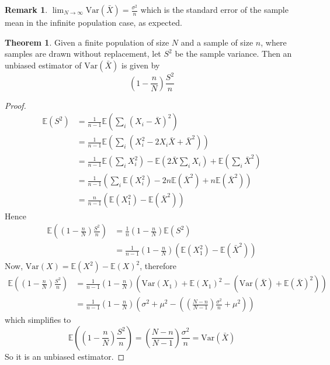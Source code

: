 \documentclass[12pt,a4paper]{article}
\theoremstyle{definition}
\newtheorem{theorem}[definition]{Theorem}
\newtheorem*{remark}{Remark}
\begin{document}
\begin{remark}
	$\lim_{N \rightarrow \infty} \text{Var}(\bar{X}) = \frac{\sigma^2}{n}$ which is the standard error of the sample mean in the infinite population case, as expected.
\end{remark}

\begin{theorem}
	Given a finite population of size $N$ and a sample of size $n$, where samples are drawn without replacement, let $S^2$ be the sample variance. Then an unbiased estimator of $\text{Var}(\bar{X})$ is given by
	\[
		\left( 1 - \frac{n}{N} \right) \frac{S^2}{n}
	\]
\end{theorem}

\begin{proof}
	\[
		\begin{aligned}
			\mathbb{E}(S^2)
				& = \frac{1}{n - 1} \mathbb{E} \left( \sum_{i} {\left( X_i - \bar{X} \right)}^2 \right) \\
				& = \frac{1}{n - 1} \mathbb{E} \left( \sum_i \left( X_i^2 - 2X_i \bar{X} + \bar{X}^2 \right) \right) \\
				& = \frac{1}{n - 1} \mathbb{E} \left( \sum_{i} X_i^2 \right) - \mathbb{E} \left( 2 \bar{X} \sum_i X_i \right) + \mathbb{E} \left( \sum_i \bar{X}^2 \right) \\
				& = \frac{1}{n - 1} \left( \sum_i \mathbb{E} \left( X_i^2 \right) - 2n \mathbb{E} \left( \bar{X}^2 \right) + n \mathbb{E} \left( \bar{X}^2 \right) \right) \\
				& = \frac{n}{n - 1} \left( \mathbb{E} \left( X_1^2 \right) - \mathbb{E} \left( \bar{X}^2 \right) \right)
		\end{aligned}
	\]
	Hence
	\[
		\begin{aligned}
			\mathbb{E} \left( \left( 1 - \frac{n}{N} \right) \frac{S^2}{n} \right)
				& = \frac{1}{n} \left( 1 - \frac{n}{N} \right) \mathbb{E} (S^2) \\
				& = \frac{1}{n - 1} \left( 1 - \frac{n}{N} \right) \left( \mathbb{E} \left( X_1^2 \right) - \mathbb{E} \left( \bar{X}^2 \right) \right)
		\end{aligned}
	\]
	Now, $\text{Var}(X) = \mathbb{E} \left( X^2 \right) - \mathbb{E} {\left( X \right)}^2$, therefore
	\[
		\begin{aligned}
			\mathbb{E} \left( \left( 1 - \frac{n}{N} \right) \frac{S^2}{n} \right)
				& = \frac{1}{n - 1} \left( 1 - \frac{n}{N} \right) \left( \text{Var}(X_1) + \mathbb{E} {\left( X_1 \right)}^2 - \left( \text{Var} (\bar{X}) + \mathbb{E} {\left( \bar{X} \right)}^2 \right) \right) \\
				& = \frac{1}{n - 1} \left( 1 - \frac{n}{N} \right) \left( \sigma^2 + \mu^2 - \left( \left( \frac{N - n}{N - 1} \right) \frac{\sigma^2}{n} + \mu^2 \right) \right)
		\end{aligned}
	\]
	which simplifies to
	\[
		\mathbb{E} \left( \left( 1 - \frac{n}{N} \right) \frac{S^2}{n} \right) = \left( \frac{N - n}{N - 1} \right) \frac{\sigma^2}{n} = \text{Var}(\bar{X})
	\]
	So it is an unbiased estimator.
\end{proof}
\end{document}
